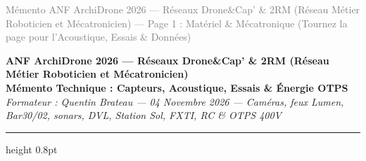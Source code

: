 \documentclass[a4paper,10pt]{article}
\begin{document}
\vspace{-6pt}
\begin{center}
  \scriptsize\textcolor{gray}{Mémento ANF ArchiDrone 2026 --- Réseaux Drone\&Cap' \& 2RM (Réseau Métier Roboticien et Mécatronicien) --- Page 1 : Matériel \& Mécatronique (Tournez la page pour l'Acoustique, Essais \& Données)}
\end{center}

\newpage

\begin{center}
  {\small\bfseries\textcolor{OceanDeep}{ANF ArchiDrone 2026 --- Réseaux Drone\&Cap' \& 2RM (Réseau Métier Roboticien et Mécatronicien)}} \\
  \vspace{1pt}
  {\large\bfseries\textcolor{OceanMedium}{Mémento Technique : Capteurs, Acoustique, Essais \& Énergie OTPS}} \\
  \vspace{1pt}
  {\scriptsize\textit{Formateur : Quentin Brateau --- 04 Novembre 2026 --- Caméras, feux Lumen, Bar30/02, sonars, DVL, Station Sol, FXTI, RC \& OTPS 400V}}
\end{center}
\vspace{-9pt}
\hrule height 0.8pt
\vspace{2pt}
\end{document}
